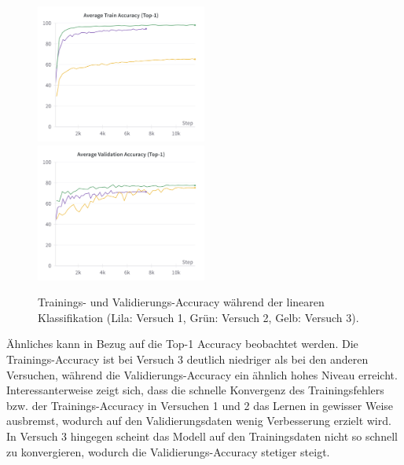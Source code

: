 \begin{figure}[h]
	\centering
	\includegraphics[width=0.5\textwidth]{figure_results_supcon-lin_avg-train-acc.png}%
	\includegraphics[width=0.5\textwidth]{figure_results_supcon-lin_avg-val-acc.png}
	\caption[Trainings- und Validierungs-Accuracy während der linearen Klassifikation.]{Trainings- und Validierungs-Accuracy während der linearen Klassifikation (\textcolor{exp1}{Lila}: Versuch 1, \textcolor{exp2}{Grün}: Versuch 2, \textcolor{exp3}{Gelb}: Versuch 3).}
	\label{fig:supcon-lin-acc}
\end{figure}

Ähnliches kann in Bezug auf die Top-1 Accuracy beobachtet werden. Die Trainings-Accuracy ist bei Versuch 3 deutlich niedriger als bei den anderen Versuchen, während die Validierungs-Accuracy ein ähnlich hohes Niveau erreicht. Interessanterweise zeigt sich, dass die schnelle Konvergenz des Trainingsfehlers bzw. der Trainings-Accuracy in Versuchen 1 und 2 das Lernen in gewisser Weise ausbremst, wodurch auf den Validierungsdaten wenig Verbesserung erzielt wird. In Versuch 3 hingegen scheint das Modell auf den Trainingsdaten nicht so schnell zu konvergieren, wodurch die Validierungs-Accuracy stetiger steigt.

